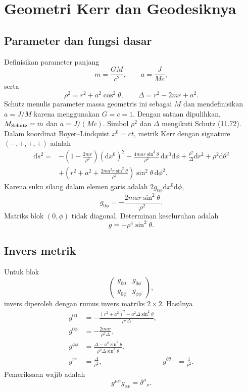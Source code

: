 \documentclass[12pt,a4paper]{report}
\newcommand{\dd}{\mathrm{d}}
\begin{document}
\chapter{Geometri Kerr dan Geodesiknya}

\section{Parameter dan fungsi dasar}

Definisikan parameter panjang
\[
 m=\frac{GM}{c^2},\qquad a=\frac{J}{Mc},
\]
serta
\[
 \rho^2=r^2+a^2\cos^2\theta,
 \qquad
 \Delta=r^2-2mr+a^2.
\]
Schutz menulis parameter massa geometris ini sebagai $M$ dan mendefinisikan
$a=J/M$ karena menggunakan $G=c=1$. Dengan satuan dipulihkan, $M_{\rm Schutz}=m$
dan $a=J/(Mc)$. Simbol $\rho^2$ dan $\Delta$ mengikuti Schutz (11.72).
Dalam koordinat Boyer--Lindquist $x^0=ct$, metrik Kerr dengan signature
$(-,+,+,+)$ adalah
\begin{align}
 \dd s^2={}&-\left(1-\frac{2mr}{\rho^2}\right)(\dd x^0)^2
 -\frac{4mar\sin^2\theta}{\rho^2}\,\dd x^0\dd\phi
 +\frac{\rho^2}{\Delta}\dd r^2+\rho^2\dd\theta^2\\
 &+\left(r^2+a^2+\frac{2ma^2r\sin^2\theta}{\rho^2}\right)
 \sin^2\theta\,\dd\phi^2.
\end{align}
Karena suku silang dalam elemen garis adalah $2g_{0\phi}\dd x^0\dd\phi$,
\[
 g_{0\phi}=-\frac{2mar\sin^2\theta}{\rho^2}.
\]
Matriks blok $(0,\phi)$ tidak diagonal. Determinan keseluruhan adalah
\[
 g=-\rho^4\sin^2\theta.
\]

\section{Invers metrik}

Untuk blok
\[
 \begin{pmatrix}g_{00}&g_{0\phi}\\g_{0\phi}&g_{\phi\phi}\end{pmatrix},
\]
invers diperoleh dengan rumus invers matriks $2\times2$. Hasilnya
\begin{align}
 g^{00}&=-\frac{(r^2+a^2)^2-a^2\Delta\sin^2\theta}
 {\rho^2\Delta},\\
 g^{0\phi}&=-\frac{2mar}{\rho^2\Delta},\\
 g^{\phi\phi}&=\frac{\Delta-a^2\sin^2\theta}
 {\rho^2\Delta\sin^2\theta},\\
 g^{rr}&=\frac{\Delta}{\rho^2},
 &g^{\theta\theta}&=\frac1{\rho^2}.
\end{align}
Pemeriksaan wajib adalah
\[
 g^{\mu\alpha}g_{\alpha\nu}=\delta^\mu{}_\nu.
\]
\end{document}
